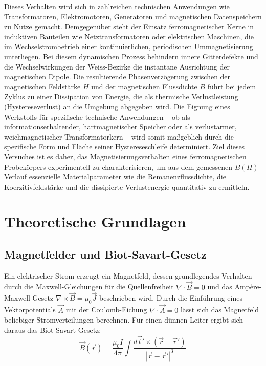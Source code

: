 \documentclass[11pt,a4paper]{article}
\numberwithin{equation}{section}
\begin{document}
\noindent Dieses Verhalten wird sich in zahlreichen technischen Anwendungen wie Transformatoren, Elektromotoren, Generatoren und magnetischen Datenspeichern zu Nutze gemacht. 
\noindent Demgegenüber steht der Einsatz ferromagnetischer Kerne in induktiven Bauteilen wie Netztransformatoren oder elektrischen Maschinen, die im Wechselstrombetrieb einer kontinuierlichen, periodischen Ummagnetisierung unterliegen. Bei diesem dynamischen Prozess behindern innere Gitterdefekte und die Wechselwirkungen der Weiss-Bezirke die instantane Ausrichtung der magnetischen Dipole. Die resultierende Phasenverzögerung zwischen der magnetischen Feldstärke \(H\) und der magnetischen Flussdichte \(B\) führt bei jedem Zyklus zu einer Dissipation von Energie, die als thermische Verlustleistung (Hystereseverlust) an die Umgebung abgegeben wird.
\noindent Die Eignung eines Werkstoffs für spezifische technische Anwendungen – ob als informationserhaltender, hartmagnetischer Speicher oder als verlustarmer, weichmagnetischer Transformatorkern – wird somit maßgeblich durch die spezifische Form und Fläche seiner Hystereseschleife determiniert. Ziel dieses Versuches ist es daher, das Magnetisierungsverhalten eines ferromagnetischen Probekörpers experimentell zu charakterisieren, um aus dem gemessenen \(B(H)\)-Verlauf essenzielle Materialparameter wie die Remanenzflussdichte, die Koerzitivfeldstärke und die dissipierte Verlustenergie quantitativ zu ermitteln.


\section{Theoretische Grundlagen}

\subsection{Magnetfelder und Biot-Savart-Gesetz}
Ein elektrischer Strom erzeugt ein Magnetfeld, dessen grundlegendes Verhalten durch die Maxwell-Gleichungen für die Quellenfreiheit \(\nabla \cdot \vec{B} = 0\) und das Ampère-Maxwell-Gesetz \(\nabla \times \vec{B} = \mu_0 \vec{J}\) beschrieben wird. Durch die Einführung eines Vektorpotentials \(\vec{A}\) mit der Coulomb-Eichung \(\nabla \cdot \vec{A} = 0\) lässt sich das Magnetfeld beliebiger Stromverteilungen berechnen. Für einen dünnen Leiter ergibt sich daraus das Biot-Savart-Gesetz:
\begin{equation}
    \vec{B}(\vec{r}) = \frac{\mu_0 I}{4\pi} \int \frac{d\vec{l}' \times (\vec{r} - \vec{r}')}{|\vec{r} - \vec{r}'|^3}
\end{equation}
\end{document}
